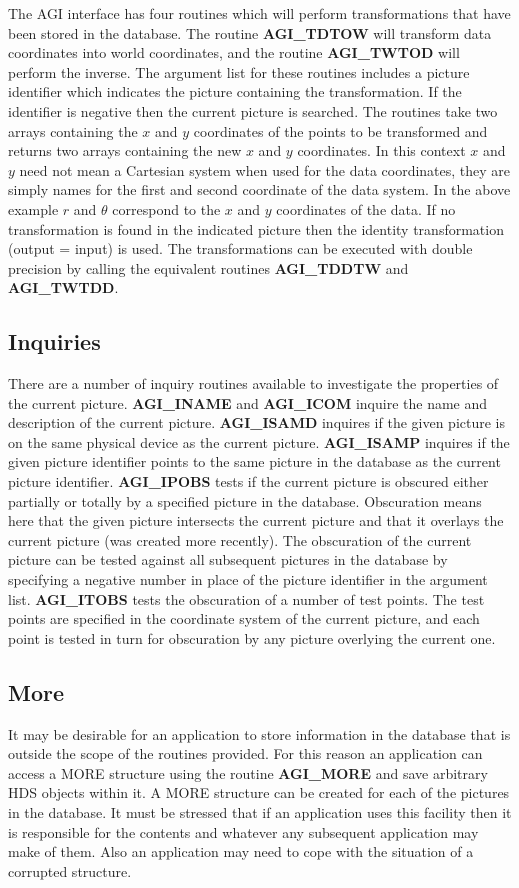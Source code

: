 The AGI interface has four routines which will perform transformations
that have been stored in the database. The routine {\bf AGI\_TDTOW}
will transform data coordinates into world coordinates, and the routine
{\bf AGI\_TWTOD} will perform the inverse.
The argument list for these routines includes a picture identifier which
indicates the picture containing the transformation. If the identifier is
negative then the current picture is searched.
The routines take two arrays containing the $x$ and $y$ coordinates of the
points to be transformed and returns two arrays containing the new
$x$ and $y$ coordinates. In this context $x$ and $y$ need not mean a
Cartesian system when used for the data coordinates, they are simply
names for the first and second coordinate of the data system. In the above
example $r$ and $\theta$ correspond to the $x$ and $y$ coordinates of the
data. If no transformation is found in the indicated picture then the
identity transformation (output = input) is used. The transformations
can be executed with double precision by calling the equivalent routines
{\bf AGI\_TDDTW} and {\bf AGI\_TWTDD}.

\subsection{Inquiries}
There are a number of inquiry routines available to investigate the properties
of the current picture.
{\bf AGI\_INAME} and {\bf AGI\_ICOM} inquire the name and description of the
current picture.
{\bf AGI\_ISAMD} inquires if the given picture is on the same physical device
as the current picture.
{\bf AGI\_ISAMP} inquires if the given picture identifier points to the
same picture in the database as the current picture identifier.
{\bf AGI\_IPOBS} tests if the current picture is obscured either partially or
totally by a specified picture in the database.
Obscuration means here that the given picture intersects the current picture
and that it overlays the current picture (was created more recently).
The obscuration of the current picture can be tested against all subsequent
pictures in the database by specifying a negative number in place of the
picture identifier in the argument list.
{\bf AGI\_ITOBS} tests the obscuration of a number of test points.
The test points are specified in the coordinate system of the current picture,
and each point is tested in turn for obscuration by any picture overlying the
current one.

\subsection{More}
It may be desirable for an application to store information in the database
that is outside the scope of the routines provided. For this reason an
application can access a MORE structure using the routine {\bf AGI\_MORE}
and save arbitrary HDS objects within it. A MORE structure can be created
for each of the pictures in the database. It must be stressed that if an
application uses this facility then it is responsible for the contents
and whatever any subsequent application may make of them. Also an
application may need to cope with the situation of a corrupted structure.


